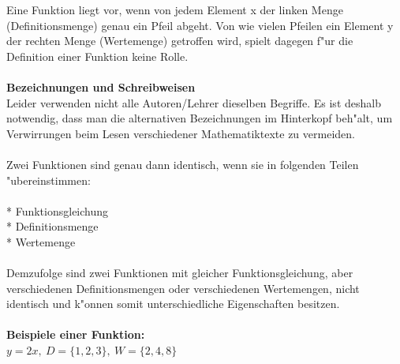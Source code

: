 Eine Funktion liegt vor, wenn von jedem Element x der linken Menge (Definitionsmenge)
genau ein Pfeil abgeht.
Von wie vielen Pfeilen ein Element y der rechten Menge (Wertemenge)
getroffen wird, spielt dagegen f"ur die Definition einer Funktion keine Rolle. \\
\\
\textbf{Bezeichnungen und Schreibweisen}
\\
Leider verwenden nicht alle Autoren/Lehrer dieselben Begriffe.
Es ist deshalb notwendig, dass man die alternativen Bezeichnungen
im Hinterkopf beh"alt, um Verwirrungen beim Lesen verschiedener Mathematiktexte
zu vermeiden. \\
\\
Zwei Funktionen sind genau dann identisch, wenn sie in folgenden Teilen "ubereinstimmen:\\
\\
* Funktionsgleichung \\
* Definitionsmenge \\
* Wertemenge \\
\\
Demzufolge sind zwei Funktionen mit gleicher Funktionsgleichung, aber verschiedenen Definitionsmengen
oder verschiedenen Wertemengen, nicht identisch und k"onnen somit unterschiedliche Eigenschaften besitzen. \\
\\
\textbf{Beispiele einer Funktion:} \\
$ y = 2x , \: D = \{ 1, 2, 3 \} , \: W = \{ 2, 4, 8 \} $ \\

